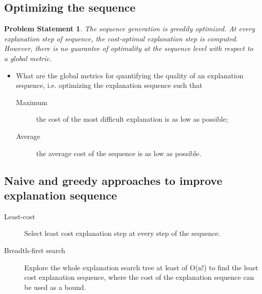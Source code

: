\documentclass[a4paper,UKenglish,cleveref, autoref, cleveref, thm-restate,pdfa]{lipics-v2021}
\newtheorem{problem}[prob]{Problem Statement}
\begin{document}
	
	
	
	\subsection{Optimizing the sequence}
	\begin{problem}\label{problem-statement:sequence-optimisation}
		The sequence generation is greedily optimized.	At every explanation step of sequence, the cost-optimal explanation step is computed. However, there is \emph{no guarantee of optimality at the sequence level} with respect to a global metric.
	\end{problem}
	
	\begin{itemize}
		\item[Q1] What are the global metrics for quantifying the quality of an explanation sequence, i.e. optimizing the explanation sequence such that
		\begin{description}
			\item[Maximum] the cost of the most difficult explanation is as low as possible;
			\item[Average]  the average cost of the sequence is as low as possible.
		\end{description}	
	\end{itemize}	
	
	
	\subsection*{Naive and greedy approaches to improve explanation sequence}
	
	\begin{description}
		\item[Least-cost] Select least cost explanation step at every step of the sequence.
		\item[Breadth-first search] Explore the whole explanation search tree at least of O(n!) to find the least cost explanation sequence, where the cost of the explanation sequence can be used as a bound.
	\end{description}
	
\end{document}
